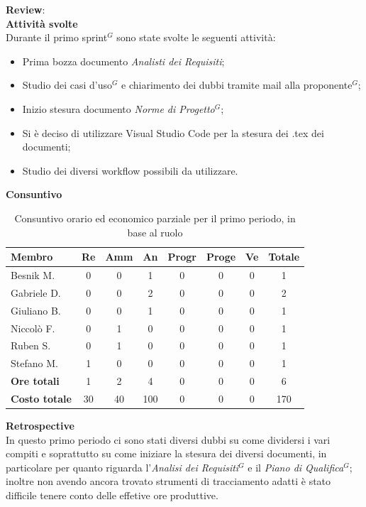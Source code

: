 \documentclass[a4paper,10pt]{article}
\begin{document}
\textbf{Review}: \\
\textbf{Attività svolte}\\
Durante il primo sprint$^G$ sono state svolte le seguenti attività:
\begin{itemize}
  \item Prima bozza documento \textit{Analisti dei Requisiti};
  \item Studio dei casi d'uso$^G$ e chiarimento dei dubbi tramite mail alla proponente$^G$;
  \item Inizio stesura documento \textit{Norme di Progetto$^G$};
  \item Si è deciso di utilizzare Visual Studio Code per la stesura dei .tex dei documenti;
  \item Studio dei diversi workflow possibili da utilizzare.
\end{itemize}
\textbf{Consuntivo}
\begin{table}[H]
\centering
\begin{tabular}{|l|c|c|c|c|c|c|c|}
\hline
\textbf{Membro} & \textbf{Re} & \textbf{Amm} & \textbf{An} & \textbf{Progr} & \textbf{Proge} & \textbf{Ve} & \textbf{Totale} \\
\hline
Besnik M.  & 0 & 0 & 1 & 0 & 0 & 0 & 1 \\
Gabriele D. & 0 & 0 & 2 & 0 & 0 & 0 & 2 \\
Giuliano B. & 0 & 0 & 1 & 0 & 0 & 0 & 1 \\
Niccolò F.  & 0 & 1 & 0 & 0 & 0 & 0 & 1 \\
Ruben S. & 0 & 1 & 0 & 0 & 0 & 0 & 1 \\
Stefano M. & 1 & 0 & 0 & 0 & 0 & 0 & 1 \\
\hline
\textbf{Ore totali} & 1 & 2 & 4 & 0 & 0 & 0 & 6 \\
\hline
\textbf{Costo totale} & 30 & 40 & 100 & 0 & 0 & 0 & 170 \\
\hline
\end{tabular}
\caption{Consuntivo orario ed economico parziale per il primo periodo, in base al ruolo}
\end{table}

\textbf{Retrospective} \\
In questo primo periodo ci sono stati diversi dubbi su come dividersi i vari compiti e soprattutto su come iniziare la stesura dei diversi documenti, in particolare per quanto riguarda l'\textit{Analisi dei Requisiti$^G$} e il \textit{Piano di Qualifica$^G$}; inoltre non avendo ancora trovato strumenti di tracciamento adatti è stato difficile tenere conto delle effetive ore produttive.
\end{document}
